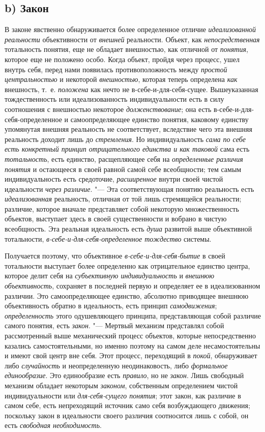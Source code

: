 {{\subsection[b) Закон]{b) Закон}
В законе явственно обнаруживается более определенное отличие
{\em идеализованной реальности}
объективности от
{\em внешней} реальности.
Объект, как {\em непосредственная}
тотальность понятия, еще не обладает внешностью, как отличной
от {\em понятия}, которое
еще не положено особо. Когда объект, пройдя через процесс, ушел внутрь
себя, перед нами появилась противоположность между
{\em простой центральностью}
и некоторой
{\em внешностью}, которая
теперь определена {\em как}
внешность, т.~е.
{\em положена} как нечто
не в-себе-и-для-себя-сущее. Вышеуказанная тождественность или
идеализованность индивидуальности есть в силу соотношения с внешностью
некоторое {\em долженствование};
она есть в-себе-и-для-себя-определенное и самоопределяющее
единство понятия, каковому единству упомянутая внешняя реальность не
соответствует, вследствие чего эта внешняя реальность доходит лишь до
{\em стремления}. Но
индивидуальность {\em сама по себе есть
конкретный принцип отрицательного единства и как таковой}
сама есть
{\em тотальность}, есть
единство, расщепляющее себя на
{\em определенные различия понятия}
и остающееся в своей равной самой себе всеобщности; тем самым
индивидуальность есть средоточие,
{\em расширенное} внутри
своей чистой идеальности {\em через
различие}. "--- Эта соответствующая понятию реальность есть
{\em идеализованная}
реальность, отличная от той лишь стремящейся реальности;
различие, которое вначале представляет собой некоторую множественность
объектов, выступает здесь в своей существенности и вобрано в чистую
всеобщность. Эта реальная идеальность есть
{\em душа} развитой выше
объективной тотальности,
{\em в-себе-и-для-себя-определенное
тождество} системы.

Получается поэтому, что объективное
{\em в-себе-и-для-себя-бытие}
в своей тотальности выступает более определенно как
отрицательное единство центра, которое делит себя на
{\em субъективную индивидуальность}
и {\em внешнюю
объективность}, сохраняет в последней первую и определяет ее
в идеализованном различии. Это самоопределяющее единство, абсолютно
приводящее внешнюю объективность обратно в идеальность, есть принцип
{\em самодвижения};
{\em определенность} этого
одушевляющего принципа, представляющая собой различие самого понятия, есть
{\em закон}. "--- Мертвый
механизм представлял собой рассмотренный выше механический
процесс объектов, которые непосредственно казались самостоятельными, но
именно поэтому на самом деле несамостоятельны и имеют свой центр вне себя.
Этот процесс, переходящий в
{\em покой}, обнаруживает
либо {\em случайность} и
неопределенную неодинаковость, либо
{\em формальное единообразие}.
Это единообразие есть
{\em правило}, но не
{\em закон}. Лишь
свободный механизм обладает некоторым
{\em законом},
собственным определением чистой индивидуальности или
{\em для-себя-сущего понятия};
этот закон, как различие в самом себе, есть непреходящий
источник само себя возбуждающего движения; поскольку закон в идеальности
своего различия соотносится лишь с собой, он есть
{\em свободная необходимость}.

}}

